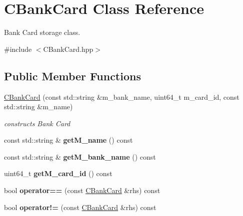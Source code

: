 \hypertarget{classCBankCard}{}\section{C\+Bank\+Card Class Reference}
\label{classCBankCard}


Bank Card storage class.  




{\ttfamily \#include $<$C\+Bank\+Card.\+hpp$>$}

\subsection*{Public Member Functions}
\begin{DoxyCompactItemize}
\item 
\hyperlink{classCBankCard_a8ae5155b20539fccbc8c1851a3fbfff7}{C\+Bank\+Card} (const std\+::string \&m\+\_\+bank\+\_\+name, uint64\+\_\+t m\+\_\+card\+\_\+id, const std\+::string \&m\+\_\+name)
\begin{DoxyCompactList}\small\item\em constructs Bank Card \end{DoxyCompactList}\item 
const std\+::string \& {\bfseries get\+M\+\_\+name} () const \hypertarget{classCBankCard_a2655c7b75022c6d49dc603c8d5c4ba1c}{}\label{classCBankCard_a2655c7b75022c6d49dc603c8d5c4ba1c}

\item 
const std\+::string \& {\bfseries get\+M\+\_\+bank\+\_\+name} () const \hypertarget{classCBankCard_aa6c72eeda83741d332ea5cacb4d7cd22}{}\label{classCBankCard_aa6c72eeda83741d332ea5cacb4d7cd22}

\item 
uint64\+\_\+t {\bfseries get\+M\+\_\+card\+\_\+id} () const \hypertarget{classCBankCard_aa01979f7b587dc82cd371974bec4437e}{}\label{classCBankCard_aa01979f7b587dc82cd371974bec4437e}

\item 
bool {\bfseries operator==} (const \hyperlink{classCBankCard}{C\+Bank\+Card} \&rhs) const \hypertarget{classCBankCard_a87abf8476093a0d26b2cefb94fe21feb}{}\label{classCBankCard_a87abf8476093a0d26b2cefb94fe21feb}

\item 
bool {\bfseries operator!=} (const \hyperlink{classCBankCard}{C\+Bank\+Card} \&rhs) const \hypertarget{classCBankCard_a8dc6afd3b22f23a044b647661fc579cc}{}\label{classCBankCard_a8dc6afd3b22f23a044b647661fc579cc}

\end{DoxyCompactItemize}


